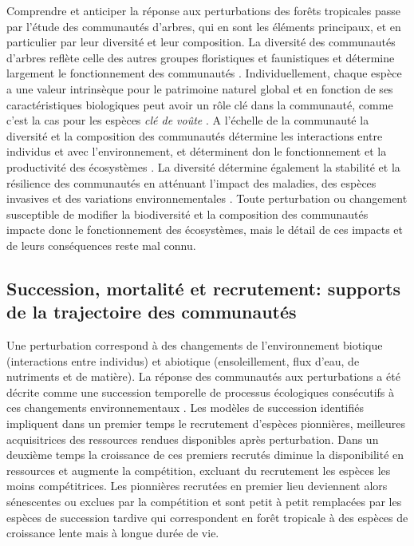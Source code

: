 \documentclass[
  11pt,
  french,
  A4paper,
  extrafontsizes,onecolumn,openright
  ]{memoir}
\begin{document}
Comprendre et anticiper la réponse aux perturbations des forêts
tropicales passe par l'étude des communautés d'arbres, qui en sont les
éléments principaux, et en particulier par leur diversité et leur
composition. La diversité des communautés d'arbres reflète celle des
autres groupes floristiques et faunistiques et détermine largement le
fonctionnement des communautés \autocite{Guitet2017}. Individuellement,
chaque espèce a une valeur intrinsèque pour le patrimoine naturel global
et en fonction de ses caractéristiques biologiques peut avoir un rôle
clé dans la communauté, comme c'est la cas pour les espèces \emph{clé de
voûte} \autocites{Jones1994}{Power1996}{Gardner2007}. A l'échelle de la
communauté la diversité et la composition des communautés détermine les
interactions entre individus et avec l'environnement, et déterminent don
le fonctionnement et la productivité des écosystèmes
\autocite{Begon2006}. La diversité détermine également la stabilité et
la résilience des communautés en atténuant l'impact des maladies, des
espèces invasives et des variations environnementales
\autocite{Elmqvist2003}. Toute perturbation ou changement susceptible de
modifier la biodiversité et la composition des communautés impacte donc
le fonctionnement des écosystèmes, mais le détail de ces impacts et de
leurs conséquences reste mal connu.

\subsection{Succession, mortalité et recrutement: supports de la
trajectoire des
communautés}\label{succession-mortalite-et-recrutement-supports-de-la-trajectoire-des-communautes}

Une perturbation correspond à des changements de l'environnement
biotique (interactions entre individus) et abiotique (ensoleillement,
flux d'eau, de nutriments et de matière). La réponse des communautés aux
perturbations a été décrite comme une succession temporelle de processus
écologiques consécutifs à ces changements environnementaux
\autocite{Clements1916}. Les modèles de succession identifiés impliquent
dans un premier temps le recrutement d'espèces pionnières, meilleures
acquisitrices des ressources rendues disponibles après perturbation.
Dans un deuxième temps la croissance de ces premiers recrutés diminue la
disponibilité en ressources et augmente la compétition, excluant du
recrutement les espèces les moins compétitrices. Les pionnières
recrutées en premier lieu deviennent alors sénescentes ou exclues par la
compétition et sont petit à petit remplacées par les espèces de
succession tardive qui correspondent en forêt tropicale à des espèces de
croissance lente mais à longue durée de vie.
\end{document}
